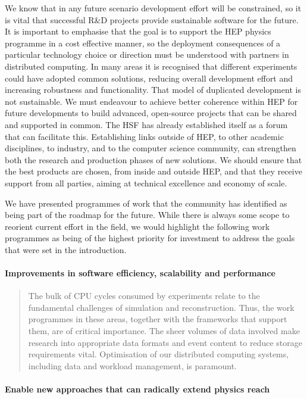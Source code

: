 We know that in any future scenario development effort will be
constrained, so it is vital that successful R\&D projects provide
sustainable software for the future. It is important to emphasise that the goal
is to support the HEP physics programme in a cost effective manner, so the
deployment consequences of a particular technology choice or direction must be
understood with partners in distributed computing. In many areas it is recognised
that different experiments could have adopted common solutions,
reducing overall development effort and increasing robustness and
functionality. That model of duplicated development is not sustainable. We must
endeavour to achieve better coherence within HEP for future developments
to build advanced, open-source projects that can be shared and supported
in common. The HSF has already established itself as a forum that can
facilitate this. Establishing links outside of HEP, to other academic
disciplines, to industry, and to the computer science community, can
strengthen both the research and production phases of new solutions. We
should ensure that the best products are chosen, from inside and outside
HEP, and that they receive support from all parties, aiming at technical
excellence and economy of scale.

We have presented programmes of work that the community has identified
as being part of the roadmap for the future. While there is always some
scope to reorient current effort in the field, we would highlight the
following work programmes as being of the highest priority for
investment to address the goals that were set in the introduction.

\paragraph{Improvements in software efficiency, scalability and performance}

\begin{quote}
The bulk of CPU cycles consumed by experiments relate to the fundamental
challenges of simulation and reconstruction. Thus, the work programmes
in these areas, together with the frameworks that support them, are of
critical importance. The sheer volumes of data involved make research
into appropriate data formats and event content to reduce storage
requirements vital. Optimisation of our distributed computing systems,
including data and workload management, is paramount.
\end{quote}

\paragraph{Enable new approaches that can radically extend physics reach}

